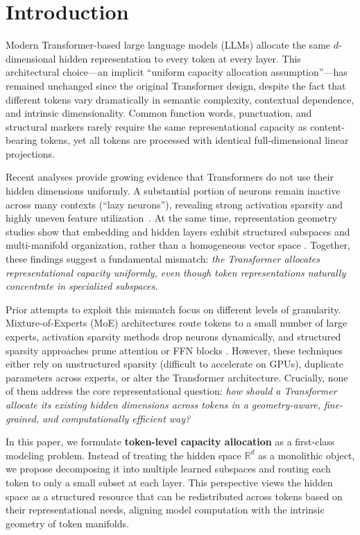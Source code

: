 \documentclass{article}
\theoremstyle{plain}
\theoremstyle{definition}
\theoremstyle{remark}
\begin{document}
\section{Introduction}

Modern Transformer-based large language models (LLMs) allocate the same
$d$-dimensional hidden representation to every token at every layer.
This architectural choice---an implicit ``uniform capacity allocation
assumption''---has remained unchanged since the original Transformer design,
despite the fact that different tokens vary dramatically in semantic
complexity, contextual dependence, and intrinsic dimensionality.
Common function words, punctuation, and structural markers rarely require the
same representational capacity as content-bearing tokens, yet all tokens are
processed with identical full-dimensional linear projections.

Recent analyses provide growing evidence that Transformers do not use their
hidden dimensions uniformly.
A substantial portion of neurons remain inactive across many contexts
(``lazy neurons''), revealing strong activation sparsity and highly uneven
feature utilization~\citep{li2023lazyneuron,liu2024trainingfreeactivationsparsitylarge,zhang2024activationsparsitypretrain}.
At the same time, representation geometry studies show that embedding and
hidden layers exhibit structured subspaces and multi-manifold organization,
rather than a homogeneous vector space
\citep{baevski2019adaptiveinput,mehta2020define,mickus2022muppet}.
Together, these findings suggest a fundamental mismatch:
\emph{the Transformer allocates representational capacity uniformly, even
though token representations naturally concentrate in specialized subspaces.}

Prior attempts to exploit this mismatch focus on different levels of
granularity.
Mixture-of-Experts (MoE) architectures route tokens to a small number of large
experts, activation sparsity methods drop neurons dynamically, and structured
sparsity approaches prune attention or FFN blocks
\citep{farina2024sparsitysurvey,yu2023gpusqtlm,shen2024hardwareaware}.
However, these techniques either rely on unstructured sparsity (difficult to
accelerate on GPUs), duplicate parameters across experts, or alter the
Transformer architecture.
Crucially, none of them address the core representational question:
\emph{how should a Transformer allocate its existing hidden dimensions across
tokens in a geometry-aware, fine-grained, and computationally efficient way?}

In this paper, we formulate \textbf{token-level capacity allocation} as a
first-class modeling problem.
Instead of treating the hidden space $\mathbb{R}^d$ as a monolithic object, we
propose decomposing it into multiple learned subspaces and routing each token
to only a small subset at each layer.
This perspective views the hidden space as a structured resource that can be
redistributed across tokens based on their representational needs, aligning
model computation with the intrinsic geometry of token manifolds.
\end{document}
